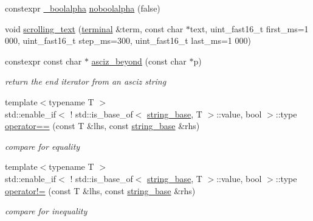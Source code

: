 \begin{DoxyCompactItemize}
\item 
constexpr \hyperlink{structhwlib_1_1__boolalpha}{\+\_\+boolalpha} \hyperlink{namespacehwlib_a6fe77cc67d9850cb262eb6e15e37724d}{noboolalpha} (false)
\item 
void \hyperlink{namespacehwlib_a26e9f9f673f95ec60d66ef4f269fe45d}{scrolling\+\_\+text} (\hyperlink{classhwlib_1_1terminal}{terminal} \&term, const char $\ast$text, uint\+\_\+fast16\+\_\+t first\+\_\+ms=1 \textquotesingle{}000, uint\+\_\+fast16\+\_\+t step\+\_\+ms=300, uint\+\_\+fast16\+\_\+t last\+\_\+ms=1 \textquotesingle{}000)
\item 
\mbox{\label{namespacehwlib_ac2e019795d659ed910859234b24a55ac}} 
constexpr const char $\ast$ \hyperlink{namespacehwlib_ac2e019795d659ed910859234b24a55ac}{asciz\+\_\+beyond} (const char $\ast$p)
\begin{DoxyCompactList}\small\item\em return the end iterator from an asciz string \end{DoxyCompactList}\item 
\mbox{\label{namespacehwlib_a5c3610a4a7cf0e2909eb00c77c9fa5f0}} 
{\footnotesize template$<$typename T $>$ }\\std\+::enable\+\_\+if$<$ ! std\+::is\+\_\+base\+\_\+of$<$ \hyperlink{classhwlib_1_1string__base}{string\+\_\+base}, T $>$\+::value, bool $>$\+::type \hyperlink{namespacehwlib_a5c3610a4a7cf0e2909eb00c77c9fa5f0}{operator==} (const T \&lhs, const \hyperlink{classhwlib_1_1string__base}{string\+\_\+base} \&rhs)
\begin{DoxyCompactList}\small\item\em compare for equality \end{DoxyCompactList}\item 
\mbox{\label{namespacehwlib_a20a6e09156c0627a1d75183ac6b1abea}} 
{\footnotesize template$<$typename T $>$ }\\std\+::enable\+\_\+if$<$ ! std\+::is\+\_\+base\+\_\+of$<$ \hyperlink{classhwlib_1_1string__base}{string\+\_\+base}, T $>$\+::value, bool $>$\+::type \hyperlink{namespacehwlib_a20a6e09156c0627a1d75183ac6b1abea}{operator!=} (const T \&lhs, const \hyperlink{classhwlib_1_1string__base}{string\+\_\+base} \&rhs)
\begin{DoxyCompactList}\small\item\em compare for inequality \end{DoxyCompactList}\item 

\end{DoxyCompactItemize}
